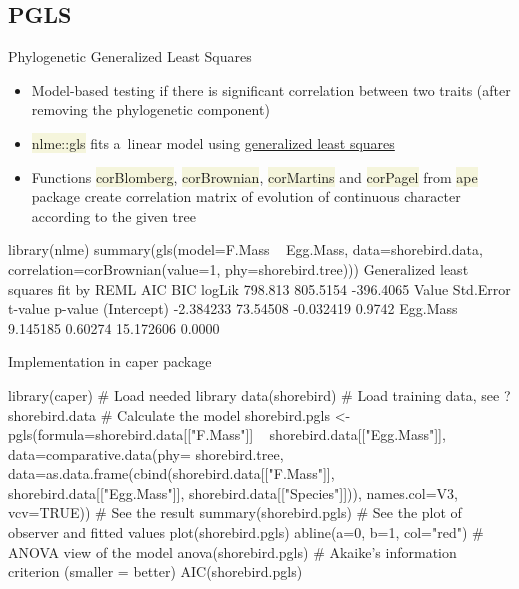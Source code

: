 \documentclass[compress, xelatex, 11pt, xcolor=svgnames, aspectratio=169,
	hyperref={
		bookmarks=true,
		unicode=true,
		colorlinks=true,
		pdftitle={Molecular data in R},
		plainpages=false,
		pdfauthor={Vojtech Zeisek},
		pdfsubject={Course about phylogeny and evolution in R},
		pdfcreator={XeLaTeX},
		pdfkeywords={R, evolution, phylogeny, molecular data},
		linkcolor=Crimson, %
		anchorcolor=Magenta, %
		citecolor=Magenta, %
		filecolor=Magenta, %
		menucolor=Magenta, %
		urlcolor=DodgerBlue, %
		},
	url={hyphens, lowtilde} %
	]{beamer}
\renewcommand{\texttt}[1]{\colorbox{Beige}{{\ttfamily #1}}}
\begin{document}
\subsection{PGLS}

\begin{frame}[fragile]{Phylogenetic Generalized Least Squares}
	\begin{itemize}
		\item Model-based testing if there is significant correlation between two traits (after removing the phylogenetic component)
		\item \texttt{nlme::gls} fits a~linear model using \href{https://en.wikipedia.org/wiki/Generalized_least_squares}{generalized least squares}
		\item Functions \texttt{corBlomberg}, \texttt{corBrownian}, \texttt{corMartins} and \texttt{corPagel} from \texttt{ape} package create correlation matrix of evolution of continuous character according to the given tree
	\end{itemize}
	\begin{spluscode}
    library(nlme)
    summary(gls(model=F.Mass ~ Egg.Mass, data=shorebird.data,
      correlation=corBrownian(value=1, phy=shorebird.tree)))
      Generalized least squares fit by REML
          AIC      BIC    logLik
      798.813 805.5154 -396.4065
                    Value Std.Error   t-value p-value
    (Intercept) -2.384233  73.54508 -0.032419  0.9742
    Egg.Mass     9.145185   0.60274 15.172606  0.0000
\end{spluscode}
\end{frame}

\begin{frame}[fragile]{Implementation in caper package}
	\begin{spluscode}
    library(caper) # Load needed library
    data(shorebird) # Load training data, see ?shorebird.data
    # Calculate the model
    shorebird.pgls <- pgls(formula=shorebird.data[["F.Mass"]] ~
      shorebird.data[["Egg.Mass"]], data=comparative.data(phy=
      shorebird.tree, data=as.data.frame(cbind(shorebird.data[["F.Mass"]],
      shorebird.data[["Egg.Mass"]], shorebird.data[["Species"]])),
      names.col=V3, vcv=TRUE))
    # See the result
    summary(shorebird.pgls)
    # See the plot of observer and fitted values
    plot(shorebird.pgls)
    abline(a=0, b=1, col="red")
    # ANOVA view of the model
    anova(shorebird.pgls)
    # Akaike's information criterion (smaller = better)
    AIC(shorebird.pgls)
	\end{spluscode}
\end{frame}
\end{document}
